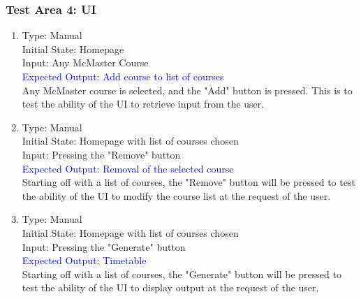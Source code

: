 \documentclass[11pt, oneside]{article}   	%
\begin{document}
\subsubsection{Test Area 4: UI}
\begin{enumerate}

\item Type: Manual \\
Initial State: Homepage \\
Input: Any McMaster Course \\
\textcolor{blue}{Expected Output: Add course to list of courses} \\
Any McMaster course is selected, and the "Add" button is pressed. This is to test the ability of the UI to retrieve input from the user. \\

\item Type: Manual \\
Initial State: Homepage with list of courses chosen\\
Input:  Pressing the "Remove" button \\
\textcolor{blue}{Expected Output: Removal of the selected course} \\
Starting off with a list of courses, the "Remove" button will be pressed to test the ability of the UI to modify the course list at the request of the user.  \\


\item Type: Manual \\
Initial State: Homepage with list of courses chosen\\
Input:  Pressing the "Generate" button \\
\textcolor{blue}{Expected Output: Timetable} \\
Starting off with a list of courses, the "Generate" button will be pressed to test the ability of the UI to display output at the request of the user.  \\
\end{enumerate}
\end{document}
